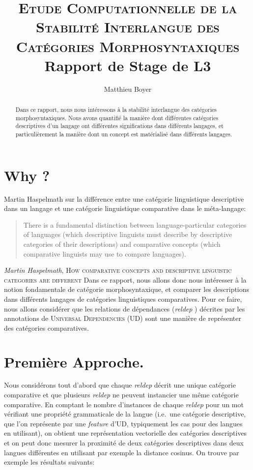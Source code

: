 \documentclass{cours}
\title{\textsc{Etude Computationnelle de la Stabilité Interlangue des Catégories Morphosyntaxiques}\\
{\small Rapport de Stage de L3} }
\author{Matthieu Boyer}
\begin{document}
    \begin{abstract}
        Dans ce rapport, nous nous intéressons à la stabilité interlangue des catégories morphosyntaxiques.
        Nous avons quantifié la manière dont différentes catégories descriptives d'un langage ont différentes
        significations dans différents langages,
        et particulièrement la manière dont un concept est matérialisé dans différents langages.
    \end{abstract}


    \section{Why ?}\label{sec:why-?}
    Martin Haspelmath sur la différence entre une catégorie linguistique descriptive dans un langage et une catégorie
    linguistique comparative dans le méta-langage:
    \begin{quote}
        There is a fundamental distinction between language-particular categories of languages (which descriptive
        linguists must describe by descriptive categories of their descriptions) and comparative concepts (which
        comparative linguists may use to compare languages).
    \end{quote}
    {\flushright
    {\textit{Martin Haspelmath}, \textsc{How comparative concepts and descriptive linguistic categories are different}}}
    Dans ce rapport, nous allons donc nous intéresser à la notion fondamentale de catégorie morphosyntaxique, et
    comparer les descriptions dans différents langages de catégories linguistiques comparatives.
    Pour ce faire, nous allons considérer que les relations de dépendances (\textit{reldep}
    ) décrites par les annotations de \textsc{Universal Dependencies} (UD)
    sont une manière de représenter des catégories comparatives.


    \section{Première Approche.}\label{sec:premiere-approche.}
    Nous considérons tout d'abord que chaque \textit{reldep} décrit une unique catégorie comparative et que plusieurs
    \textit{reldep} ne peuvent instancier une même catégorie comparative.
    En comptant le nombre d'instances de chaque \textit{reldep}
    pour un mot vérifiant une propriété grammaticale de la langue (i.e.\
    une catégorie descriptive, que l'on représente par une \textit{feature}
    d'UD, typiquement les cas pour des langues en utilisant), on obtient une représentation vectorielle des catégories
    descriptives et on peut donc mesurer la proximité de deux catégories descriptives dans deux langues différentes en
    utilisant par exemple la distance cosinus.
    On trouve par exemple les résultats suivants:
\end{document}
